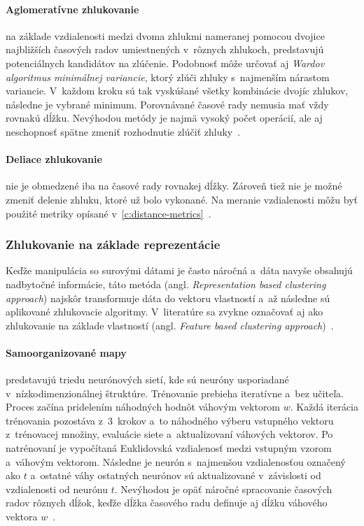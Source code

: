 \documentclass[a4paper,twoside,slovak,12pt,appendix]{article}
\begin{document}
\paragraph{Aglomeratívne zhlukovanie} na základe vzdialenosti medzi dvoma
zhlukmi nameranej pomocou dvojice najbližších časových radov umiestnených
v~rôznych zhlukoch, predstavujú potenciálnych kandidátov na zlúčenie. Podobnosť
môže určovať aj \textit{Wardov algoritmus minimálnej variancie}, ktorý zlúči
zhluky s~najmenším nárastom variancie. V~každom kroku sú tak vyskúšané všetky
kombinácie dvojíc zhlukov, následne je vybrané minimum. Porovnávané časové rady
nemusia mať vždy rovnakú dĺžku. Nevýhodou metódy je najmä vysoký počet operácií,
ale aj neschopnosť spätne zmeniť rozhodnutie zlúčiť
zhluky~\cite{WarrenLiao2005}.

\paragraph{Deliace zhlukovanie} nie je obmedzené iba na časové rady rovnakej
dĺžky. Zároveň tiež nie je možné zmeniť delenie zhluku, ktoré už bolo vykonané.
Na meranie vzdialenosti môžu byť použité metriky opísané
v~\ref{c:distance-metrics}~\cite{WarrenLiao2005}.

\subsubsection{Zhlukovanie na základe reprezentácie}
\label{c:feature-clustering}
Keďže manipulácia so surovými dátami je často náročná a~dáta navyše obsahujú
nadbytočné informácie, táto metóda (angl. \textit{Representation based
clustering approach}) najskôr transformuje dáta do vektoru vlastností a~až
následne sú aplikované zhlukovacie algoritmy. V~literatúre sa zvykne označovať
aj ako zhlukovanie na základe vlastností (angl. \textit{Feature based clustering
approach})~\cite{Rani2012}.

\paragraph{Samoorganizované mapy} predstavujú triedu neurónových sietí, kde
sú neuróny usporiadané v~nízkodimenzionálnej štruktúre. Trénovanie prebieha
iteratívne a~bez učiteľa. Proces začína pridelením náhodných hodnôt váhovým
vektorom $w$. Každá iterácia trénovania pozostáva z~3~krokov a~to náhodného
výberu vstupného vektoru z~trénovacej množiny, evaluácie siete a~aktualizovaní
váhových vektorov. Po natrénovaní je vypočítaná Euklidovská vzdialenosť medzi
vstupným vzorom a~váhovým vektorom. Následne je neurón s~najmenšou vzdialenosťou
označený ako $t$ a~ostatné váhy ostatných neurónov sú aktualizované v~závislosti
od vzdialenosti od neurónu $t$. Nevýhodou je opäť náročné spracovanie časových
radov rôznych dĺžok, keďže dĺžka časového radu definuje aj dĺžku váhového
vektora $w$~\cite{Kohonen2001,WarrenLiao2005}.
\end{document}
